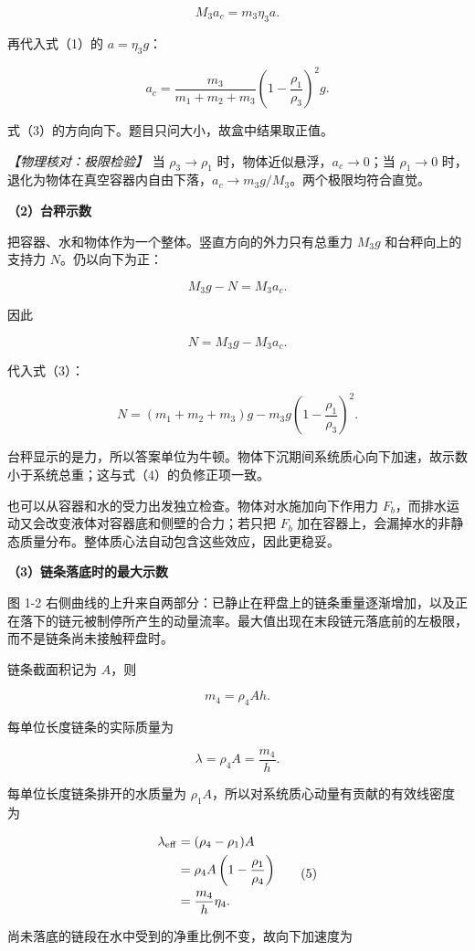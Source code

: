 \documentclass[12pt,a4paper,UTF8]{ctexart}
\begin{document}
\[M_3a_c=m_3\eta_3a.\]

再代入式（1）的 \(a=\eta_3g\)：

\[\boxed{
a_c=\frac{m_3}{m_1+m_2+m_3}
\left(1-\frac{\rho_1}{\rho_3}\right)^2g
}. \tag{3}\]

式（3）的方向向下。题目只问大小，故盒中结果取正值。

\emph{【物理核对：极限检验】} 当 \(\rho_3\to\rho_1\)
时，物体近似悬浮，\(a_c\to0\)；当 \(\rho_1\to0\)
时，退化为物体在真空容器内自由下落，\(a_c\to m_3g/M_3\)。两个极限均符合直觉。

\textbf{（2）台秤示数}

把容器、水和物体作为一个整体。竖直方向的外力只有总重力 \(M_3g\)
和台秤向上的支持力 \(N\)。仍以向下为正：

\[M_3g-N=M_3a_c.\]

因此

\[N=M_3g-M_3a_c.\]

代入式（3）：

\[\boxed{
N=(m_1+m_2+m_3)g
-m_3g\left(1-\frac{\rho_1}{\rho_3}\right)^2
}. \tag{4}\]

台秤显示的是力，所以答案单位为牛顿。物体下沉期间系统质心向下加速，故示数小于系统总重；这与式（4）的负修正项一致。

也可以从容器和水的受力出发独立检查。物体对水施加向下作用力
\(F_b\)，而排水运动又会改变液体对容器底和侧壁的合力；若只把 \(F_b\)
加在容器上，会漏掉水的非静态质量分布。整体质心法自动包含这些效应，因此更稳妥。

\textbf{（3）链条落底时的最大示数}

图 1-2
右侧曲线的上升来自两部分：已静止在秤盘上的链条重量逐渐增加，以及正在落下的链元被制停所产生的动量流率。最大值出现在末段链元落底前的左极限，而不是链条尚未接触秤盘时。

链条截面积记为 \(A\)，则

\[m_4=\rho_4Ah.\]

每单位长度链条的实际质量为

\[\lambda=\rho_4A=\frac{m_4}{h}.\]

每单位长度链条排开的水质量为
\(\rho_1A\)，所以对系统质心动量有贡献的有效线密度为

\[\begin{aligned}
\lambda_{\rm eff}
&=(\rho_4-\rho_1)A\\
&=\rho_4A\left(1-\frac{\rho_1}{\rho_4}\right)\\
&=\frac{m_4}{h}\eta_4.
\end{aligned} \tag{5}\]

尚未落底的链段在水中受到的净重比例不变，故向下加速度为
\end{document}
